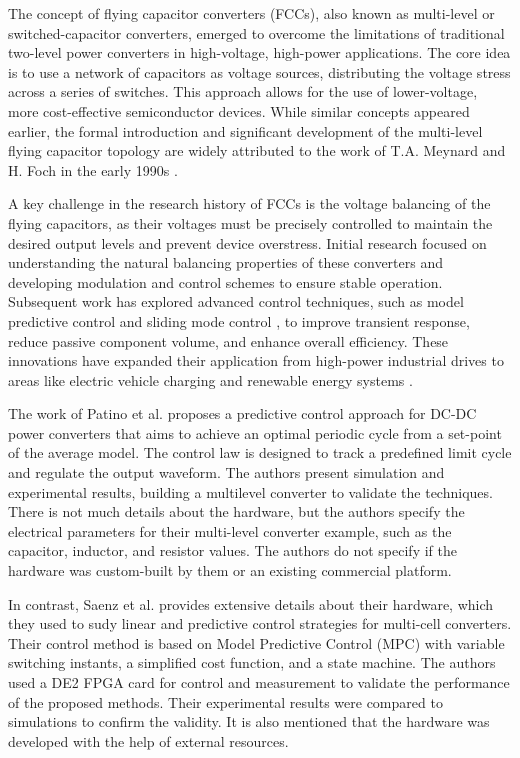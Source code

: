 \documentclass[11pt, letterpaper]{article}
\begin{document}
The concept of flying capacitor converters (FCCs), also known as multi-level or switched-capacitor converters, 
emerged to overcome the limitations of traditional two-level power converters in high-voltage, high-power 
applications. The core idea is to use a network of capacitors as voltage sources, distributing the voltage 
stress across a series of switches. This approach allows for the use of lower-voltage, more cost-effective 
semiconductor devices. While similar concepts appeared earlier, the formal introduction and significant 
development of the multi-level flying capacitor topology are widely attributed to the work of T.A. Meynard 
and H. Foch in the early 1990s \cite{Meynard:1993}.

A key challenge in the research history of FCCs is the voltage balancing of the flying capacitors, 
as their voltages must be precisely controlled to maintain the desired output levels and prevent device 
overstress. Initial research focused on understanding the natural balancing properties of these converters 
and developing modulation and control schemes to ensure stable operation. Subsequent work has explored 
advanced control techniques, such as model predictive control \cite{Wang:2018} and sliding mode control 
\cite{Benmiloud:2019}, to improve transient response, reduce passive component volume, and enhance overall 
efficiency. These innovations have expanded their application from high-power industrial drives to areas 
like electric vehicle charging and renewable energy systems \cite{Lai:1999}.

The work of Patino et al. \cite{Patino:2010} proposes a predictive control approach for DC-DC 
power converters that aims to achieve an optimal periodic cycle from a set-point of the average 
model. The control law is designed to track a predefined limit cycle and regulate the output 
waveform. The authors present simulation and experimental results, building a multilevel converter 
to validate the techniques. There is not much details about the hardware, but the authors specify 
the electrical parameters for their multi-level converter example, such as the capacitor, inductor, 
and resistor values. The authors do not specify if the hardware was custom-built by them 
or an existing commercial platform.

In contrast, Saenz et al. \cite{Saenz:2014} provides extensive details about their hardware, 
which they used to sudy linear and predictive control strategies for multi-cell converters. 
Their control method is based on Model Predictive Control (MPC) with variable switching instants, 
a simplified cost function, and a state machine. The authors used a DE2 FPGA card for control 
and measurement to validate the performance of the proposed methods. Their experimental results 
were compared to simulations to confirm the validity. It is also mentioned that the hardware 
was developed with the help of external resources.
\end{document}
